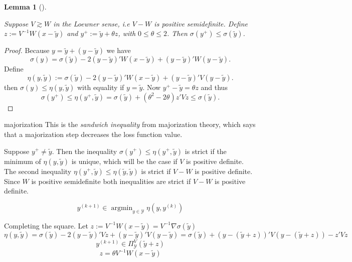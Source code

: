 \documentclass[
  12pt,
  letterpaper,
  DIV=11,
  numbers=noendperiod]{scrartcl}
\theoremstyle{plain}
\newtheorem{lemma}{Lemma}[section]
\theoremstyle{remark}
\begin{document}
\begin{lemma}[]\protect\hypertarget{lem-major}{}\label{lem-major}

Suppose \(V\gtrsim W\) in the Loewner sense, i.e \(V-W\) is positive
semidefinite. Define \(z:=V^{-1}W(x-\tilde y)\) and
\(y^+:=\tilde y+\theta z\), with \(0\leq\theta\leq 2\). Then
\(\sigma(y^+)\leq\sigma(\tilde y)\).

\end{lemma}

\begin{proof}
Because \(y=\tilde y+(y-\tilde y)\) we have \begin{equation}
\sigma(y)=
\sigma(\tilde y)-2(y-\tilde y)'W(x-\tilde y)+(y-\tilde y)'W(y - \tilde y).
\end{equation} Define \begin{equation}
\eta(y,\tilde y):=
\sigma(\tilde y)-2(y-\tilde y)'W(x-\tilde y)+(y-\tilde y)'V(y - \tilde y).
\end{equation} then \(\sigma(y)\leq\eta(y,\tilde y)\) with equality if
\(y=\tilde y\). Now \(y^+-\tilde y=\theta z\) and thus \begin{equation}
\sigma(y^+)\leq\eta(y^+,\tilde y)=\sigma(\tilde y)+(\theta^2-2\theta)z'Vz\leq \sigma(\tilde y).
\end{equation}
\end{proof}

majorization This is the \emph{sandwich inequality} from majorization
theory, which says that a majorization step decreases the loss function
value.

Suppose \(y^+\neq\tilde y\). Then the inequality
\(\sigma(y^+)\leq\eta(y^+,\tilde y)\) is strict if the minimum of
\(\eta(y,\tilde y)\) is unique, which will be the case if \(V\) is
positive definite. The second inequality
\(\eta(y^+,\tilde y)\leq\eta(\tilde y,\tilde y)\) is strict if \(V-W\)
is positive definite. Since \(W\) is positive semidefinite both
inequalities are strict if \(V-W\) is positive definite.

\begin{equation}
y^{(k+1)}\in\mathop{\text{argmin}}_{y\in\mathcal{Y}}\eta(y,y^{(k)})
\end{equation}

Completing the square. Let
\(z:=V^{-1}W(x-\tilde y)=V^{-1}\nabla\sigma(\tilde y)\) \[
\eta(y,\tilde y)=
\sigma(\tilde y)-2(y-\tilde y)'Vz+(y-\tilde y)'V(y - \tilde y)=
\sigma(\tilde y)+(y-(\tilde y+z))'V(y-(\tilde y+z))-z'Vz
\] \[
y^{(k+1)}\in\Pi_{\mathcal{Y}}^V(\tilde y+z)
\] \[
z=\theta V^{-1}W(x-\tilde y)
\]
\end{document}
